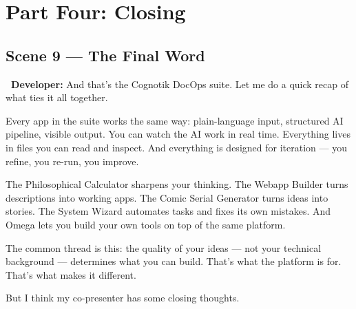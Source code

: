 \documentclass[12pt, letterpaper]{article}
\newcommand{\dev}{\textbf{\color{cogblue}\faIcon{laptop-code}\ Developer:}}
\begin{document}
  \section{Part Four: Closing}

  \subsection{Scene 9 — The Final Word}

  \begin{developerbox}
    \dev{} And that's the Cognotik DocOps suite. Let me do a quick recap of what
    ties it all together.

    \medskip
    Every app in the suite works the same way: plain-language input, structured AI
    pipeline, visible output. You can watch the AI work in real time. Everything
    lives in files you can read and inspect. And everything is designed for
    iteration — you refine, you re-run, you improve.

    \medskip
    The Philosophical Calculator sharpens your thinking. The Webapp Builder turns
    descriptions into working apps. The Comic Serial Generator turns ideas into
    stories. The System Wizard automates tasks and fixes its own mistakes. And
    Omega lets you build your own tools on top of the same platform.

    \medskip
    The common thread is this: the quality of your ideas — not your technical
    background — determines what you can build. That's what the platform is for.
    That's what makes it different.

    \medskip
    But I think my co-presenter has some closing thoughts.
  \end{developerbox}
\end{document}
